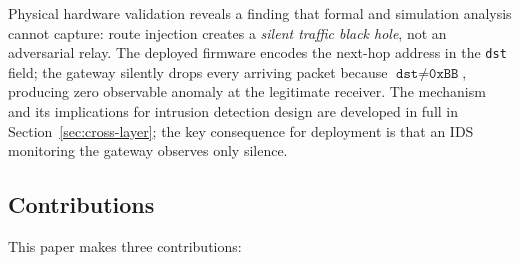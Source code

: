 \documentclass[preprint,12pt]{elsarticle}
\begin{document}
Physical hardware validation reveals a finding that formal and
simulation analysis cannot capture: route injection creates a
\emph{silent traffic black hole}, not an adversarial relay.
The deployed firmware encodes the next-hop address in the
\texttt{dst} field; the gateway silently drops every arriving
packet because $\texttt{dst} \neq \texttt{0xBB}$, producing
zero observable anomaly at the legitimate receiver.
The mechanism and its implications for intrusion detection design
are developed in full in Section~\ref{sec:cross-layer}; the key
consequence for deployment is that an IDS monitoring the gateway
observes only silence.

\subsection{Contributions}

This paper makes three contributions:
\end{document}
